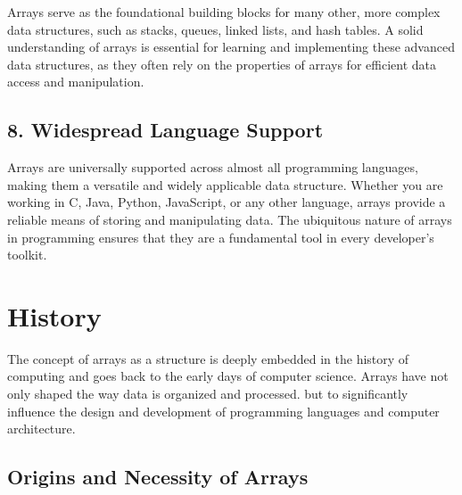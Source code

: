\documentclass[12pt, oneside]{book}
\begin{document}
Arrays serve as the foundational building blocks for many other, more complex data structures, such as stacks, queues, linked lists, and hash tables. A solid understanding of arrays is essential for learning and implementing these advanced data structures, as they often rely on the properties of arrays for efficient data access and manipulation.

\subsection{8. Widespread Language Support}

Arrays are universally supported across almost all programming languages, making them a versatile and widely applicable data structure. Whether you are working in C, Java, Python, JavaScript, or any other language, arrays provide a reliable means of storing and manipulating data. The ubiquitous nature of arrays in programming ensures that they are a fundamental tool in every developer's toolkit.

\section{History}
	
The concept of arrays as a structure is deeply embedded in the history of computing and goes back to the early days of computer science. Arrays have not only shaped the way data is organized and processed. but to significantly influence the design and development of programming languages ​​and computer architecture.
	
\subsection{Origins and Necessity of Arrays}
	
\end{document}
